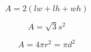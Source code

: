 \[\begin{equation} A = 2 \left( l w + l h + w h \right) \end{equation}\]

\[\begin{equation} A = \sqrt{3} s^2 \end{equation}\]

\[\begin{equation} A = 4 \pi r^2 = \pi d^2 \end{equation}\]
